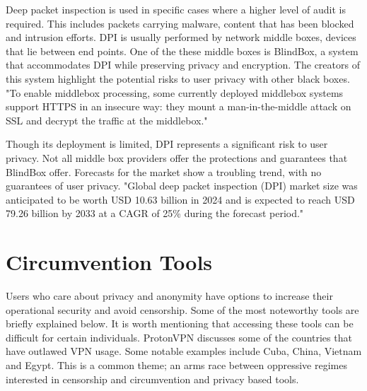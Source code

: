 Deep packet inspection is used in specific cases where a higher level of audit is required. This includes packets carrying malware, content that has been blocked and intrusion efforts. DPI is usually performed by network middle boxes, devices that lie between end points. One of the these middle boxes is BlindBox, a system that accommodates DPI while preserving privacy and encryption. The creators of this system highlight the potential risks to user privacy with other black boxes. "To enable middlebox processing, some currently deployed middlebox systems support HTTPS in
an insecure way: they mount a man-in-the-middle attack on SSL and decrypt the traffic at the middlebox." \cite{sherry2015blindbox}

Though its deployment is limited, DPI represents a significant risk to user privacy. Not all middle box providers offer the protections and guarantees that BlindBox offer. Forecasts for the market show a troubling trend, with no guarantees of user privacy. "Global deep packet inspection (DPI) market size was anticipated to be worth USD 10.63 billion in 2024 and is expected to reach USD 79.26 billion by 2033 at a CAGR of 25\% during the forecast period." \cite{DPIMarketInfo}


\section{Circumvention Tools}
Users who care about privacy and anonymity have options to increase their operational security and avoid censorship. Some of the most noteworthy tools are briefly explained below. It is worth mentioning that accessing these tools can be difficult for certain individuals. ProtonVPN discusses some of the countries that have outlawed VPN usage. \cite{protonvpn_vpn_legality_2} Some notable examples include Cuba, China, Vietnam and Egypt. This is a common theme; an arms race between oppressive regimes interested in censorship and circumvention and privacy based tools.

